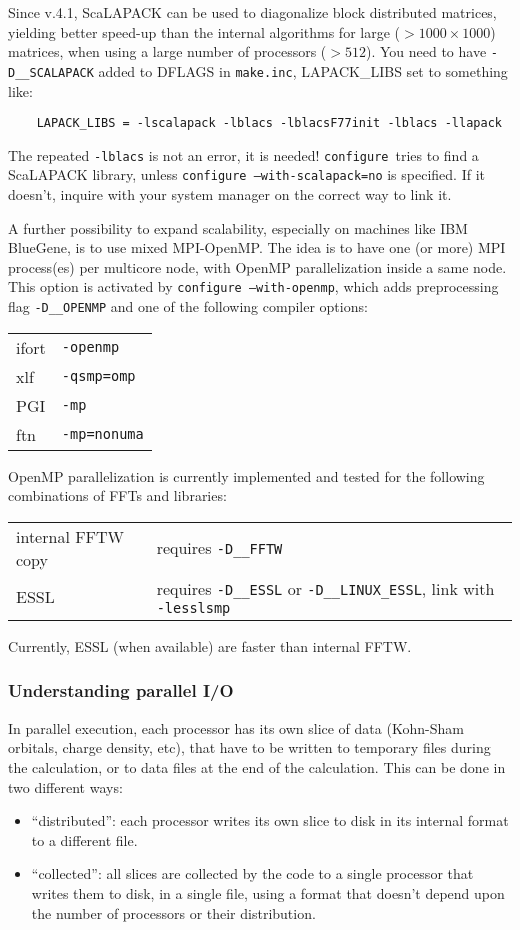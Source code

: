 \documentclass[12pt,a4paper]{article}
\def\configure{\texttt{configure}}
\begin{document}
Since v.4.1, ScaLAPACK can be used to diagonalize block distributed
matrices, yielding better speed-up than the internal algorithms for
large ($ > 1000\times 1000$) matrices, when using a large number of processors
($> 512$). You need to have \texttt{-D\_\_SCALAPACK} added to DFLAGS
in \texttt{make.inc}, LAPACK\_LIBS set to something like:
\begin{verbatim}
    LAPACK_LIBS = -lscalapack -lblacs -lblacsF77init -lblacs -llapack
\end{verbatim}
The repeated \texttt{-lblacs} is not an error, it is needed!
\configure\ tries to find a ScaLAPACK  library, unless
\texttt{configure --with-scalapack=no} is specified.
If it doesn't, inquire with your system manager
on the correct way to link it.

A further possibility to expand scalability, especially on machines
like IBM BlueGene, is to use mixed MPI-OpenMP. The idea is to have
one (or more) MPI process(es) per multicore node, with OpenMP
parallelization inside a same node. This option is activated by  \texttt{configure --with-openmp},
which adds preprocessing flag \texttt{-D\_\_OPENMP}
and one  of the following compiler options:

\begin{tabular}{ll}
 ifort& \texttt{-openmp}\\
 xlf&   \texttt{-qsmp=omp}\\
 PGI&   \texttt{-mp}\\
 ftn&   \texttt{-mp=nonuma}\\
\end{tabular}

OpenMP parallelization is currently implemented and tested for the following combinations of FFTs
and libraries:

\begin{tabular}{ll}
 internal FFTW copy &requires \texttt{-D\_\_FFTW}\\
 ESSL& requires \texttt{-D\_\_ESSL} or \texttt{-D\_\_LINUX\_ESSL}, link
 with \texttt{-lesslsmp}\\
\end{tabular}

Currently, ESSL (when available) are faster than internal FFTW.

\subsubsection{Understanding parallel I/O}
In parallel execution, each processor has its own slice of data
(Kohn-Sham orbitals, charge density, etc), that have to be written
to temporary files during the calculation,
or to data files at the end of the calculation.
This can be done in two different ways:
\begin{itemize}
\item ``distributed'': each processor
writes its own slice to disk in its internal
format to a different file.
\item ``collected'': all slices are
collected by the code to a single processor
that writes them to disk, in a single file,
using a format that doesn't depend upon
the number of processors or their distribution.
\end{itemize}
\end{document}
